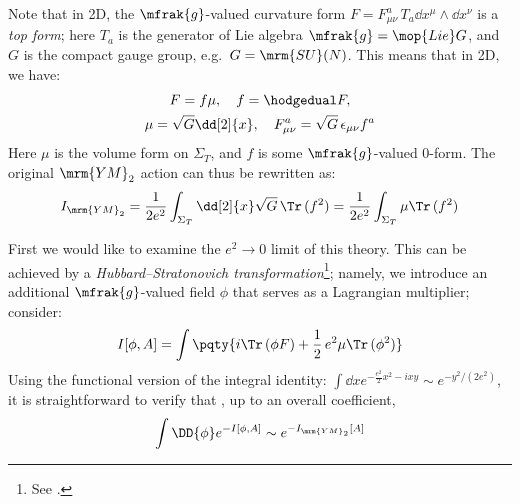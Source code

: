 \documentclass[a4paper
	,10pt
]{article}
\newcommand{\YM}{{\ensuremath{\mrm{YM}_2}}\xspace}
\begin{document}
	Note that in 2D, the $\mfrak{g}$-valued curvature form $F = F^a_{\mu\nu}\,T_a \dd{x^\mu} \wedge \dd{x^\nu}$ is a \textit{top form}; here $T_a$ is the generator of Lie algebra $\mfrak{g} = \mop{Lie} G$, and $G$ is the compact gauge group, e.g.~$G = \mrm{SU}(N)$. This means that in 2D, we have:
	\begin{gather}
		F = f\mu,\quad f = \hodgedual F,
	\\
		\mu = \sqrt{G} \dd[2]{x},\quad
		F^a_{\mu\nu} = \sqrt{G}\,\epsilon_{\mu\nu} f^a
	\end{gather}
	Here $\mu$ is the volume form on $\Sigma_T$, and $f$ is some $\mfrak{g}$-valued 0-form. The original \YM action can thus be rewritten as:
	\begin{equation}
		I_{\YM}
		= \frac{1}{2e^2}
			\int_{\Sigma_T} \dd[2]{x}
			\sqrt{G}
			\,\Tr\,(f^2)
		= \frac{1}{2e^2}
			\int_{\Sigma_T} \mu \Tr\,(f^2)
	\label{eq:scalar_action}
	\end{equation}
	
	First we would like to examine the $e^2 \to 0$ limit of this theory. This can be achieved by a \textit{Hubbard--Stratonovich transformation}\footnote{
		See . 
	}; namely, we introduce an additional $\mfrak{g}$-valued field $\phi$ that serves as a Lagrangian multiplier; consider:
	\begin{equation}
		I[\phi,A] = \int \pqty{
				i \Tr\,(\phi F)
				+ \frac{1}{2}\, e^2\mu \Tr\,(\phi^2)
			}
	\label{eq:convenient_action}
	\end{equation}
	Using the functional version of the integral identity: $
		\int \dd{x}
			e^{
				- \frac{e^2}{2} x^2
				- ixy
			}
		\sim e^{-y^2/(2e^2)}
	$, it is straightforward to verify that \cite{Witten:1991we}, up to an overall coefficient,
	\begin{equation}
		\int \DD{\phi} e^{-I[\phi,A]}
		\sim e^{-I_\YM[A]}
	\end{equation}
	
\end{document}
